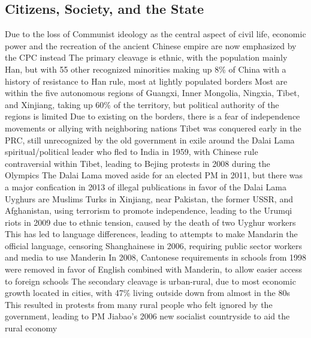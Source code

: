 \documentclass[11 pt, twoside]{article}
\newenvironment{outline*}
{
	\begin{outline}[enumerate]
	}
	{\end{outline}
}
\begin{document}
\begin{outlne*}
\subsection{Citizens, Society, and the State}
\begin{outline*}
\1 Due to the loss of Communist ideology as the central aspect of civil life, economic power and the recreation of the ancient Chinese empire are now emphasized by the CPC instead
\1 The primary cleavage is ethnic, with the population mainly Han, but with 55 other recognized minorities making up 8\% of China with a history of resistance to Han rule, most at lightly populated borders
\2 Most are within the five autonomous regions of Guangxi, Inner Mongolia, Ningxia, Tibet, and Xinjiang, taking up 60\% of the territory, but political authority of the regions is limited
\2 Due to existing on the borders, there is a fear of independence movements or allying with neighboring nations
\2 Tibet was conquered early in the PRC, still unrecognized by the old government in exile around the Dalai Lama spiritual/political leader who fled to India in 1959, with Chinese rule contraversial within Tibet, leading to Bejing protests in 2008 during the Olympics
\3 The Dalai Lama moved aside for an elected PM in 2011, but there was a major confication in 2013 of illegal publications in favor of the Dalai Lama
\2 Uyghurs are Muslims Turks in Xinjiang, near Pakistan, the former USSR, and Afghanistan, using terrorism to promote independence, leading to the Urumqi riots in 2009 due to ethnic tension, caused by the death of two Uyghur workers
\2 This has led to language differences, leading to attempts to make Mandarin the official language, censoring Shanghainese in 2006, requiring public sector workers and media to use Manderin
\3 In 2008, Cantonese requirements in schools from 1998 were removed in favor of English combined with Manderin, to allow easier access to foreign schools
\1 The secondary cleavage is urban-rural, due to most economic growth located in cities, with 47\% living outside down from almost in the 80s
\2 This resulted in protests from many rural people who felt ignored by the government, leading to PM Jiabao's 2006 new socialist countryside to aid the rural economy
\1 
\end{outline*}

\end{outlne*}
\end{document}
